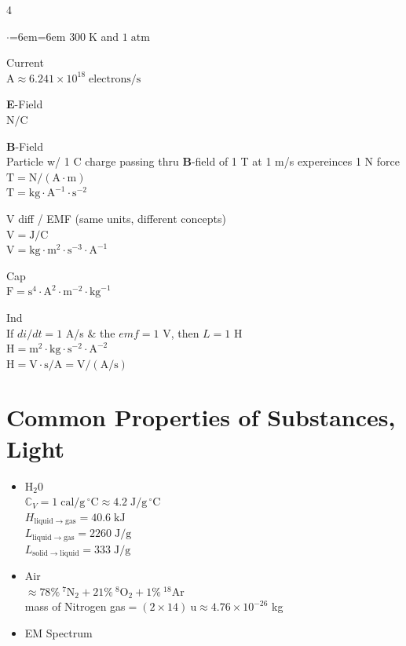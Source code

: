 \documentclass[letterpaper,landscape,10pt]{article}
\newenvironment{myitemize}
{\begin{itemize}
	\setlength{\itemsep}{0pt}
	\setlength{\parskip}{0pt}
	\setlength{\parsep}{0pt}}
{\end{itemize}}
\newenvironment{litemize}
{\begin{list}{$\cdot$}{\leftmargin=6em\labelwidth=6em}
	\setlength{\itemsep}{0pt}
	\setlength{\parskip}{0pt}
	\setlength{\parsep}{0pt}}
{\end{list}}
\begin{document}
{\begin{multicols}{4}
\begin{litemize}
		  $300\;\mathrm{K}$ and $1\;\mathrm{atm}$
	  	\item[Current] \ \\
		  $\mathrm{A}\approx
		  	6.241\times 10^{18}\;\mathrm{electrons} / \mathrm{s}$
		\item[\textbf{E}-Field] \ \\
			$\mathrm{N/C}$
		\item[\textbf{B}-Field] \ \\
			Particle w/ 1 C charge passing thru $\bm{B}$-field of 1 T at 1 m/s expereinces 1 N force \\
			$\mathrm{T} = \mathrm{N/(A \cdot m)}$ \\
			$\mathrm{T} = \mathrm{kg\cdot A^{-1} \cdot s^{-2}}$
	  	\item[V diff] / EMF (same units, different concepts) \\
			$\mathrm{V} = \mathrm{J}/\mathrm{C}$ \\
			$\mathrm{V} = \mathrm{kg\cdot{m}^2\cdot{s}^{-3}\cdot{A}^{-1}}$
	  	\item[Cap] \ \\
			$\mathrm{F} = \mbox{s}^4 \cdot \mbox{A}^2 \cdot \mbox{m}^{-2}
				\cdot \mbox{kg}^{-1}$
	  	\item[Ind] \ \\
			If $di/dt = 1$ A/s \& the $emf = 1$ V, then $L = 1$ H \\
			$\mathrm{H} = \mathrm{m}^2\cdot\mathrm{kg}\cdot
				\mathrm{s}^{-2}\cdot\mathrm{A}^{-2}$ \\
			$\mathrm{H} = \mathrm{V\cdot{s}/{A}=V/(A/s)}$
	\end{litemize}

\section*{Common Properties of Substances, Light}
	\begin{myitemize}
		\item[H$_2$0] \ \\
			$\mathbb{C}_V = 1 \;\mathrm{cal}/\mathrm{g}\,^\circ \mathrm{C}
				\approx 4.2 \;\mathrm{J}/\mathrm{g}\,^\circ \mathrm{C}$ \\
			$H_{\mathrm{liquid\rightarrow gas}} = 40.6 \;\mathrm{kJ}$ \\
			$L_{\mathrm{liquid\rightarrow gas}} = 2260 \;\mathrm{J/g}$ \\
			$L_{\mathrm{solid\rightarrow liquid}} = 333 \;\mathrm{J/g}$ \\
		\item[Air] \ \\
			$\approx 78\% \ ^7\mathrm{N}_2 + 21\%  \ ^8\mathrm{O}_2 + 1\%  \ 
				^{18}\mathrm{Ar}$\\
			mass of Nitrogen gas$= (2\times 14)\:\mathrm{u} \approx 4.76\times10^{-26}$ kg
		\item[EM Spectrum] \ \\



\end{myitemize}
\end{multicols}}
\end{document}
